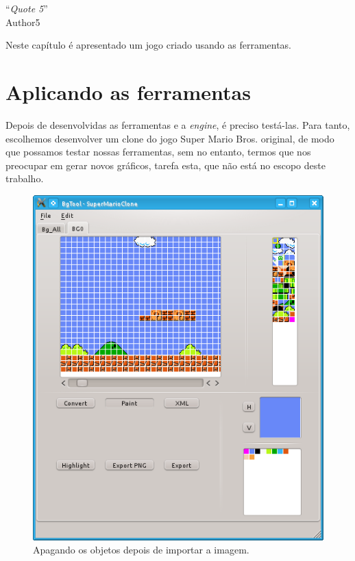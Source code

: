 \documentclass[brazil]{abnt}
\begin{document}
\vfill{}
\begin{flushright}{}``\emph{Quote 5}''\\
{\small Author5}\end{flushright}{\small \par}
\vfill{}

Neste capítulo é apresentado um jogo criado usando as ferramentas.
\newpage

\section{Aplicando as ferramentas}

Depois de desenvolvidas as ferramentas e a \textit{engine}, é preciso testá-las. Para tanto, escolhemos desenvolver um clone do jogo Super Mario Bros. original, de modo que possamos testar nossas ferramentas, sem no entanto, termos que nos preocupar em gerar novos gráficos, tarefa esta, que não está no escopo deste trabalho.

\begin{figure}[h!]
\centering
\includegraphics[scale=1]{imgs/bgtool2.png}
\caption{Apagando os objetos depois de importar a imagem.} 
\end{figure}
\end{document}
